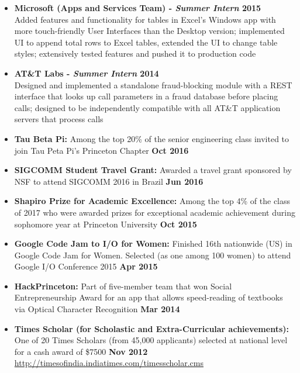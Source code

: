 \documentclass[margin]{res}
\begin{document}
\begin{resume}
\begin{itemize}
\item
{\bf Microsoft (Apps and Services Team) - {\em{Summer Intern}}  \hfill  2015}\\
Added features and functionality for tables in Excel's Windows app with more touch-friendly User Interfaces than the Desktop version; implemented UI to append total rows to Excel tables, extended the UI to change table styles; extensively tested features and pushed it to production code

\item
{\bf AT\&T Labs - {\em{Summer Intern}}  \hfill 2014}\\
Designed and implemented a standalone fraud-blocking module with a REST interface that looks up call parameters in a fraud database before placing calls; designed to be independently compatible with all AT\&T application servers that process calls

\end{itemize}


\begin{itemize}
\section{Awards  and Honors}
\item
{\bf {Tau Beta Pi:}} Among the top 20\% of the senior engineering class invited to join Tau Peta Pi's Princeton Chapter {\bf \hfill Oct 2016}

\item
{\bf {SIGCOMM Student Travel Grant:}} Awarded a travel grant sponsored by NSF to attend SIGCOMM 2016 in Brazil {\bf \hfill Jun 2016}

\item
{\bf {Shapiro Prize for Academic Excellence:}} Among the top 4\% of the class of 2017 who were awarded prizes for exceptional academic achievement during sophomore year at Princeton University {\bf \hfill Oct 2015}

\item
{\bf {Google Code Jam to I/O for Women:}} Finished 16th nationwide (US) in Google Code Jam for Women. Selected (as one among 100 women) to attend Google I/O Conference 2015 {\bf \hfill Apr 2015}

\item
{\bf {HackPrinceton:}} Part of five-member team that won Social Entrepreneurship Award for an app that allows speed-reading of textbooks via Optical Character Recognition {\bf \hfill Mar 2014}

 \item
{\bf {Times Scholar (for Scholastic and Extra-Curricular achievements):}} One of 20 Times Scholars (from 45,000 applicants) selected at national level for a cash award of \$7500  {\bf \hfill Nov 2012}\\
\url{http://timesofindia.indiatimes.com/timesscholar.cms}


\end{itemize}
\end{resume}
\end{document}
